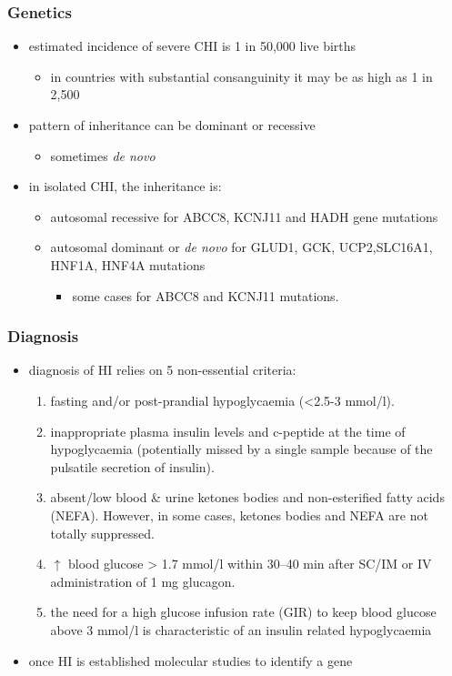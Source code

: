 \documentclass{scrartcl}
\begin{document}
\subsubsection{Genetics}
\label{sec:orgb76a144}
\begin{itemize}
\item estimated incidence of severe CHI is 1 in 50,000 live births
\begin{itemize}
\item in countries with substantial consanguinity it may be as high as 1 in 2,500
\end{itemize}
\item pattern of inheritance can be dominant or recessive
\begin{itemize}
\item sometimes \emph{de novo}
\end{itemize}
\item in isolated CHI, the inheritance is:
\begin{itemize}
\item autosomal recessive for ABCC8, KCNJ11 and HADH gene mutations
\item autosomal dominant or \emph{de novo} for GLUD1, GCK, UCP2,SLC16A1, HNF1A, HNF4A mutations
\begin{itemize}
\item some cases for ABCC8 and KCNJ11 mutations.
\end{itemize}
\end{itemize}
\end{itemize}

\subsubsection{Diagnosis}
\label{sec:orgb07b6c2}
\begin{itemize}
\item diagnosis of HI relies on 5 non-essential criteria:
\begin{enumerate}
\item fasting and/or post-prandial hypoglycaemia (<2.5-3 mmol/l).
\item inappropriate plasma insulin levels and c-peptide at the time of
hypoglycaemia (potentially missed by a single sample because of
the pulsatile secretion of insulin).
\item absent/low blood \& urine ketones bodies and non-esterified fatty
acids (NEFA). However, in some cases, ketones bodies and NEFA are
not totally suppressed.
\item \(\uparrow\) blood glucose \textgreater{} 1.7 mmol/l within 30–40 min after
SC/IM or IV administration of 1 mg glucagon.
\item the need for a high glucose infusion rate (GIR) to keep blood
glucose above 3 mmol/l is characteristic of an insulin related
hypoglycaemia
\end{enumerate}

\item once HI is established molecular studies to identify a gene
\end{itemize}
\end{document}
